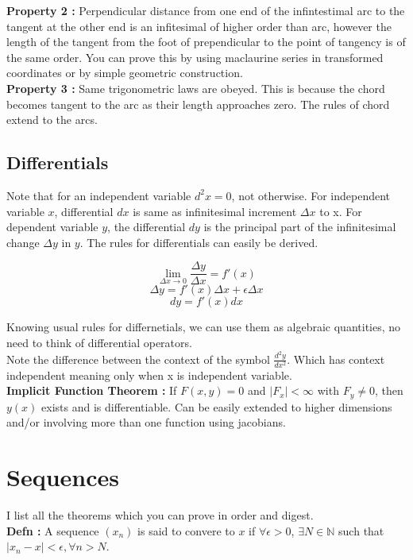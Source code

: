 \documentclass{report}
\begin{document}
\noindent \textbf{Property 2 :} Perpendicular distance from one end of the infintestimal arc to the tangent at the other end  is an infitesimal of higher order than arc, however the length of the tangent from the foot of prependicular to the point of tangency is of the same order. You can prove this by using maclaurine series in transformed coordinates or by simple geometric construction.\\

\noindent \textbf{Property 3 :} Same trigonometric laws are obeyed. This is because the chord becomes tangent to the arc as their length approaches zero. The rules of chord extend to the arcs.

\section{Differentials}

Note that for an independent variable $d^2x = 0$, not otherwise. For independent variable $x$, differential $dx$ is same as infinitesimal increment $\Delta x$ to x. For dependent variable $y$, the differential $dy$ is the principal part of the infinitesimal change $\Delta y$ in $y$. The rules for differentials can easily be derived.

$$\lim_{\Delta x\to 0} \frac{\Delta y}{\Delta x} = f'(x)$$
$$\Delta y = f'(x)\Delta x + \epsilon\Delta x$$
$$dy = f'(x)dx$$

\noindent Knowing usual rules for differnetials, we can use them as algebraic quantities, no need to think of differential operators.\\

\noindent Note the difference between the context of the symbol $\frac{d^2 y}{dx^2}$. Which has context independent meaning only when x is independent variable.\\

\noindent\textbf{Implicit Function Theorem :} If $F(x,y)=0$ and $|F_x| < \infty$ with $F_y\neq 0$, then $y(x)$ exists and is differentiable. Can be easily extended to higher dimensions and/or involving more than one function using jacobians.

\chapter{Sequences}
I list all the theorems which you can prove in order and digest.\\

\noindent\textbf{Defn :} A sequence $(x_n)$ is said to convere to $x$ if $\forall \epsilon > 0$, $\exists N\in \mathbb{N}$ such that $|x_n - x| < \epsilon, \forall n > N.$ \\
\end{document}
